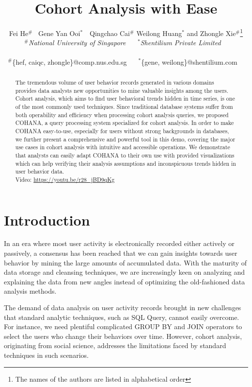 \documentclass[10pt,conference,letterpaper]{IEEEtran}
\title{Cohort Analysis with Ease}
\author{
{Fei He{\small $^{\#}$} \ Gene Yan Ooi{\small $^{*}$}\ \  Qingchao Cai{\small $^{\#}$} Weilong Huang{\small $^{*}$} and Zhongle Xie{\small $^{\#}$}}\thanks{The names of the authors are listed in alphabetical order}%
\vspace{1.6mm}\\
\fontsize{10}{10}\selectfont\itshape
$^{\#}$National University of Singapore\ \ \
$~^{*}$Shentilium Private Limited\ \ \\
\fontsize{9}{9}\selectfont\ttfamily\upshape

$^{\#}$\{hef, caiqc, zhongle\}@comp.nus.edu.sg\ \ \
$~^{*}$\{gene, weilong\}@shentilium.com\ \ 
\vspace{1.2mm}\\
\fontsize{10}{10}\selectfont\rmfamily\itshape
}
\begin{document}
\maketitle
%
\begin{abstract} 
The tremendous volume of user behavior records generated in various domains provides data analysts new opportunities to mine valuable insights among the users. Cohort analysis, which aims to find user behavioral trends hidden in time series, is one of the most commonly used techniques. Since traditional database systems suffer from both operability and efficiency when processing cohort analysis queries, we proposed COHANA\cite{jiang2016cohort}, a query processing system specialized for cohort analysis. In order to make COHANA easy-to-use, especially for users without strong backgrounds in databases, we further present a comprehensive and powerful tool in this demo, covering the major use cases in cohort analysis with intuitive and accessible operations. We demonstrate that analysts can easily adapt COHANA to their own use with provided visualizations which can help verifying their analysis assumptions and inconspicuous trends hidden in user behavior data.\\


Video: \url{https://youtu.be/r28_jBD9qKg}
\end{abstract}

%
\section{Introduction}
%
In an era where most user activity is electronically recorded either actively or passively, a consensus has been reached that we can gain insights towards user behavior by mining the large amounts of accumulated data. With the maturity of data storage and cleansing techniques, we are increasingly keen on analyzing and explaining the data from new angles instead of optimizing the old-fashioned data analysis methods.

The demand of data analysis on user activity records brought in new challenges that standard analytic techniques, such as SQL Query, cannot easily overcome. 
For instance, we need plentiful complicated GROUP BY and JOIN operators to select the users who change their behaviors over time.
However, cohort analysis, originating from social science\cite{glenn2005cohort}, addresses the limitations faced by standard techniques in such scenarios. 
\end{document}

